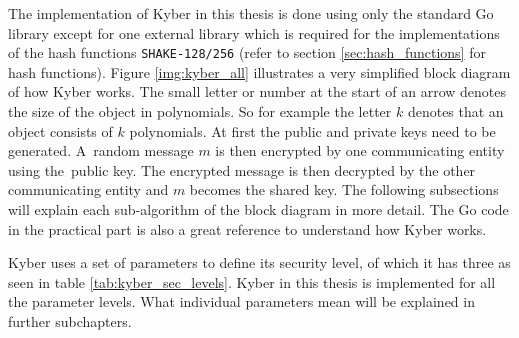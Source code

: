 The implementation of Kyber in this thesis is done using only the standard Go library except for one external library \cite{00fV2cvg7Z6H2tS3} which is required for the implementations of the hash functions \texttt{SHAKE-128/256} (refer to section \ref{sec:hash_functions} for hash functions). Figure \ref{img:kyber_all} illustrates a very simplified block diagram of how Kyber works. The small letter or number at the start of an arrow denotes the size of the object in polynomials. So for example the letter $k$ denotes that an object consists of $k$ polynomials. At first the public and private keys need to be generated. A~random message $m$ is then encrypted by one communicating entity using the~public key. The encrypted message is then decrypted by the other communicating entity and $m$ becomes the shared key. The following subsections will explain each sub-algorithm of the block diagram in more detail. The Go code in the practical part is also a great reference to understand how Kyber works.


Kyber uses a set of parameters to define its security level, of which it has three as seen in table \ref{tab:kyber_sec_levels}. Kyber in this thesis is implemented for all the parameter levels. What individual parameters mean will be explained in further subchapters.
